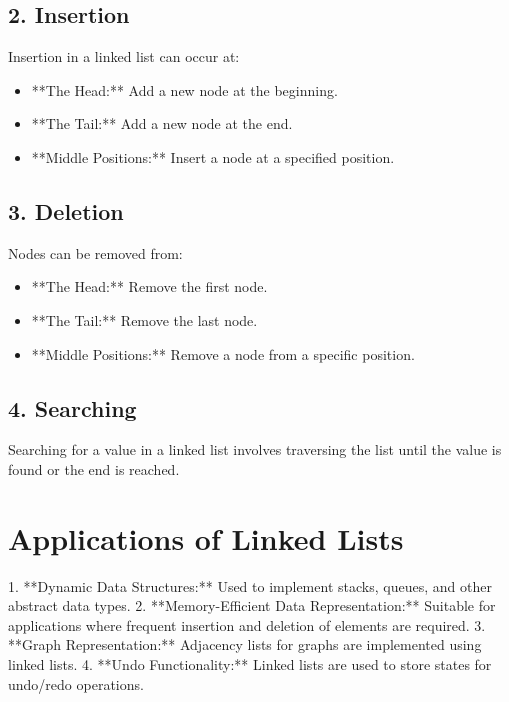\subsection*{2. Insertion}
Insertion in a linked list can occur at:
\begin{itemize}
    \item **The Head:** Add a new node at the beginning.
    \item **The Tail:** Add a new node at the end.
    \item **Middle Positions:** Insert a node at a specified position.
\end{itemize}



\subsection*{3. Deletion}
Nodes can be removed from:
\begin{itemize}
    \item **The Head:** Remove the first node.
    \item **The Tail:** Remove the last node.
    \item **Middle Positions:** Remove a node from a specific position.
\end{itemize}



\subsection*{4. Searching}
Searching for a value in a linked list involves traversing the list until the value is found or the end is reached.



\section*{Applications of Linked Lists}
1. **Dynamic Data Structures:** Used to implement stacks, queues, and other abstract data types.
2. **Memory-Efficient Data Representation:** Suitable for applications where frequent insertion and deletion of elements are required.
3. **Graph Representation:** Adjacency lists for graphs are implemented using linked lists.
4. **Undo Functionality:** Linked lists are used to store states for undo/redo operations.



